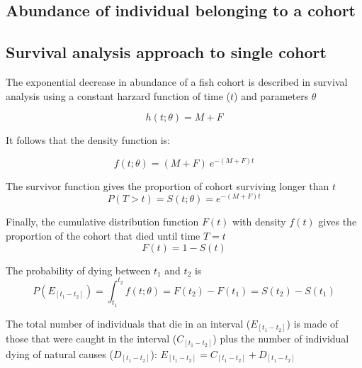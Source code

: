 

\subsection{Abundance of individual belonging to a cohort} 

\subsection{Survival analysis approach to single cohort}

The exponential decrease in abundance of a fish cohort is described in survival analysis \citep{cox84b} using a constant harzard function of time ($t$) and parameters $\theta$

\begin{equation}
h(t; \theta) = M + F
\end{equation}

It follows that the density function is:

\begin{equation}
f(t; \theta) = (M + F) \ e^{-(M+F)t}
\end{equation}

The survivor function gives the proportion of cohort surviving longer than $t$ \citep{kleinbaum2005survival}
\begin{equation}
P(T>t) = S(t; \theta) = e^{-(M+F)t}
\end{equation}

Finally, the cumulative distribution function $F(t)$ with density $f(t)$ gives the proportion of the cohort that died until time $T=t$
\begin{equation}
F(t) = 1 - S(t)
\end{equation}

The probability of dying between $t_{1}$ and $t_{2}$ is
\begin{equation}
P(E_{[t_{1}-t_{2}]}) = \int_{t_{1}}^{t_{2}} f(t; \theta) = F(t_{2}) - F(t_{1}) = S(t_{2}) - S(t_{1})
\end{equation}

The total number of individuals that die in an interval ($E_{[t_{1}-t_{2}]}$) is made of those that were caught in the interval ($C_{[t_{1}-t_{2}]}$) plus the number of individual dying of natural causes ($D_{[t_{1}-t_{2}]}$):  $E_{[t_{1}-t_{2}]} = C_{[t_{1}-t_{2}]} + D_{[t_{1}-t_{2}]}$

